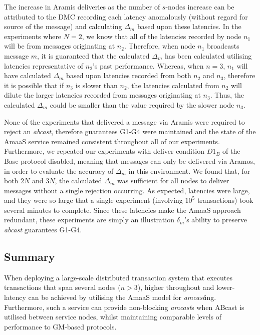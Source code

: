 	The increase in \textsf{Aramis} deliveries as the number of $s$-nodes increase can be attributed to the DMC recording each latency anomalously (without regard for source of the message) and calculating $\Delta_m$ based upon these latencies.  In the experiments where $N=2$, we know that all of the latencies recorded by node $n_1$ will be from messages originating at $n_2$.  Therefore, when node $n_1$ broadcasts message $m$, it is guaranteed that the calculated $\Delta_m$ has been calculated utilising latencies representative of $n_2$'s past performance.  Whereas, when $n=3$, $n_1$ will have calculated $\Delta_m$ based upon latencies recorded from both $n_2$ and $n_3$, therefore it is possible that if $n_3$ is slower than $n_2$, the latencies calculated from $n_2$ will dilute the larger latencies recorded from messages originating at $n_3$.  Thus, the calculated $\Delta_m$ could be smaller than the value required by the slower node $n_3$.  
	
	None of the experiments that delivered a message via \textsf{Aramis} were required to reject an \emph{abcast}, therefore guarantees G1-G4 were maintained and the state of the \textsf{AmaaS} service remained consistent throughout all of our experiments.  Furthermore, we repeated our experiments with deliver condition $D1_B$ of the \textsf{Base} protocol disabled, meaning that messages can only be delivered via \textsf{Aramos}, in order to evaluate the accuracy of $\Delta_m$ in this environment.  We found that, for both $2N$ and $3N$, the calculated $\Delta_m$ was sufficient for all nodes to deliver messages without a single rejection occurring.  As expected, latencies were large, and they were so large that a single experiment (involving $10^5$ transactions) took several minutes to complete.  Since these latencies make the \textsf{AmaaS} approach redundant, these experiments are simply an illustration $\delta_m$'s ability to preserve \emph{abcast} guarantees G1-G4.  
		
	\subsection{Summary}
	When deploying a large-scale distributed transaction system that executes transactions that span several nodes ($n > 3$), higher throughout and lower-latency can be achieved by utilising the \textsf{AmaaS} model for \emph{amcast}ing.  Furthermore, such a service can provide non-blocking \emph{amcast}s when \textsf{ABcast} is utilised between service nodes, whilst maintaining comparable levels of performance to GM-based protocols.  

